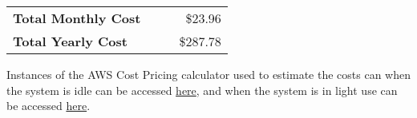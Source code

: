 \documentclass[a4paper, 11pt]{article}
\newcommand{\estimatedCostInIdleURL}{https://calculator.aws/\#/estimate?id=0f82526574f81e22825462ca5893dc9b7381e9a7}
\newcommand{\estimatedCostInUseURL}{https://calculator.aws/\#/estimate?id=33078729fb24a4066ea8e14f12bfd1392267dc69}
\begin{document}
\begin{table}[htbp]
    \setlength{\tableRowSpacing}{3pt}   %
    
    \centering
    \begin{tabularx}{\textwidth}{XXrr}
        \midrule \addlinespace[2\tableRowSpacing]
        \textbf{Total Monthly Cost}   &&& \$23.96 \\    \addlinespace[\tableRowSpacing]
        \textbf{Total Yearly Cost}   &&& \$287.78 \\
        \bottomrule
    \end{tabularx}
\end{table}

Instances of the AWS Cost Pricing calculator used to estimate the costs can when the system is idle can be accessed \href{\estimatedCostInIdleURL}{here}, and when the system is in light use can be accessed \href{\estimatedCostInUseURL}{here}.

    
    
\end{document}
